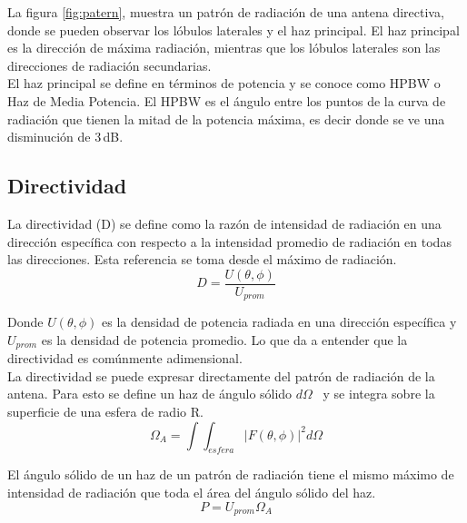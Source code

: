 La figura \ref{fig:patern}, muestra un patrón de radiación de una antena directiva, donde se pueden observar los lóbulos laterales y el haz principal. El haz principal es la dirección de máxima radiación, mientras que los lóbulos laterales son las direcciones de radiación secundarias.\\

El haz principal se define en términos de potencia y se conoce como HPBW o Haz de Media Potencia. El HPBW es el ángulo entre los puntos de la curva de radiación que tienen la mitad de la potencia máxima, es decir donde se ve una disminución de 3 dB.\\

\subsection{Directividad}

La directividad (D) se define como la razón de intensidad de radiación en una dirección específica con respecto a la intensidad promedio de radiación en todas las direcciones. Esta referencia se toma desde el máximo de radiación.\\

\begin{equation}\label{eq:directivity}
    D = \frac{U(\theta, \phi)}{U_{prom}}
\end{equation}

Donde $U(\theta, \phi)$ es la densidad de potencia radiada en una dirección específica y $U_{prom}$ es la densidad de potencia promedio. Lo que da a entender que la directividad es comúnmente adimensional.\\

La directividad se puede expresar directamente del patrón de radiación de la antena. Para esto se define un haz de ángulo sólido $d\Omega$  y se integra sobre la superficie de una esfera de radio R.\\

\begin{equation}\label{eq:solidangle}
    \Omega_{A} = \int\int_{esfera} |F(\theta, \phi)|^{2} d\Omega
\end{equation}

El ángulo sólido de un haz de un patrón de radiación tiene el mismo máximo de intensidad de radiación que toda el área del ángulo sólido del haz.\\

\begin{equation}\label{eq:powerdensity}
    P = U_{prom} \Omega_{A}
\end{equation}


